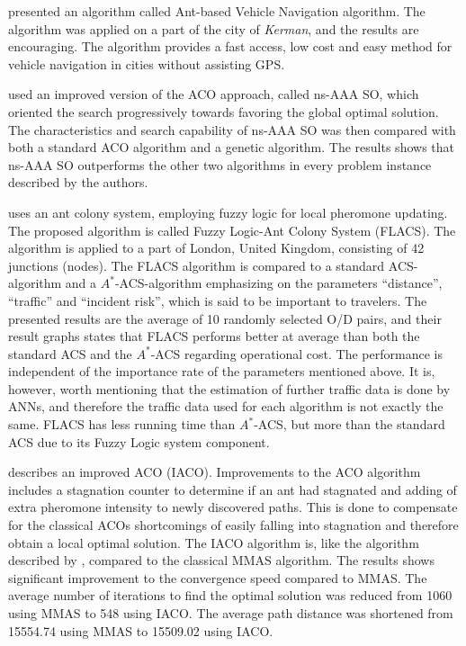 \citet{salehi-nezhad07} presented an algorithm called Ant-based Vehicle Navigation algorithm. The algorithm was applied on a part of the city of \textit{Kerman}, and the results are encouraging. The algorithm provides a fast access, low cost and easy method for vehicle navigation in cities without assisting GPS.

\citet{tripathi09} used an improved version of the ACO approach, called ns-AAA SO, which oriented the search progressively towards favoring the global optimal solution. The characteristics and search capability of ns-AAA SO was then compared with both a standard ACO algorithm and a genetic algorithm. The results shows that ns-AAA SO outperforms the other two algorithms in every problem instance described by the authors. 

\citet{salehinejad10} uses an ant colony system, employing fuzzy logic for local pheromone updating. The proposed algorithm is called Fuzzy Logic-Ant Colony System (FLACS). The algorithm is applied to a part of London, United Kingdom, consisting of 42 junctions (nodes). The FLACS algorithm is compared to a standard ACS-algorithm and a $A^*$-ACS-algorithm emphasizing on the parameters ``distance'', ``traffic'' and ``incident risk'', which is said to be important to travelers. The presented results are the average of 10 randomly selected O/D pairs, and their result graphs states that FLACS performs better at average than both the standard ACS and the $A^*$-ACS regarding operational cost. The performance is independent of the importance rate of the parameters mentioned above. It is, however, worth mentioning that the estimation of further traffic data is done by ANNs, and therefore the traffic data used for each algorithm is not exactly the same. FLACS has less running time than $A^*$-ACS, but more than the standard ACS due to its Fuzzy Logic system component. 

\citet{jiang10} describes an improved ACO (IACO). Improvements to the ACO algorithm includes a stagnation counter to determine if an ant had stagnated and adding of extra pheromone intensity to newly discovered paths. This is done to compensate for the classical ACOs shortcomings of easily falling into stagnation and therefore obtain a local optimal solution. The IACO algorithm is, like the algorithm described by \citet{yang07}, compared to the classical MMAS algorithm. The results shows significant improvement to the convergence speed compared to MMAS. The average number of iterations to find the optimal solution was reduced from 1060 using MMAS to 548 using IACO. The average path distance was shortened from 15554.74 using MMAS to 15509.02 using IACO. 

